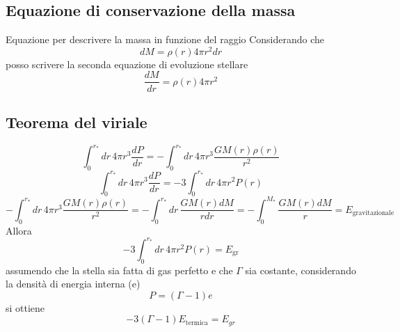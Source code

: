 \documentclass[a4paper,11pt]{report}
\theoremstyle{remark}
\theoremstyle{definition}
\begin{document}
\subsection{Equazione di conservazione della massa}

Equazione per descrivere la massa in funzione del raggio \newline
Considerando che 
\begin{equation*}
    dM = \rho(r) 4 \pi r^2 dr
\end{equation*}
posso scrivere la seconda equazione di evoluzione stellare
\begin{equation}
    \frac{dM}{dr} = \rho(r) 4 \pi r^2
\end{equation}

\subsection{Teorema del viriale}
\begin{equation*}
    \int_0^{r_*} dr \, 4 \pi r^3 \frac{dP}{dr} = -\int_0^{r_*} dr \, 4 \pi r^3 \frac{GM(r)\rho(r)}{r^2}
\end{equation*}
\begin{equation*}
    \int_0^{r_*} dr \, 4 \pi r^3 \frac{dP}{dr} = - 3 \int_0^{r_*} dr \, 4 \pi r^2 P(r)
\end{equation*}
\begin{equation*}
    -\int_0^{r_*} dr \, 4 \pi r^3 \frac{GM(r)\rho(r)}{r^2} = -\int_0^{r_*} dr \, \frac{GM(r)dM}{rdr} = -\int_0^{M_*} \frac{GM(r)dM}{r} = E_{\mbox{gravitazionale}} 
\end{equation*}
Allora 
\begin{equation*}
    - 3 \int_0^{r_*} dr \, 4 \pi r^2 P(r) = E_{\mbox{gr}}
\end{equation*}
assumendo che la stella sia fatta di gas perfetto e che $\Gamma$ sia costante, considerando la densità di energia interna (e)
\begin{equation*}
    P = (\Gamma - 1)e
\end{equation*}
si ottiene 
\begin{equation*}
    -3 (\Gamma - 1) E_{\mbox{termica}} = E_{gr}
\end{equation*}
\end{document}
